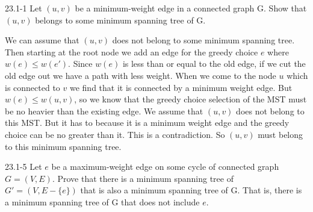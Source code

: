 \begin{problem}{23.1-1}
  Let $(u,v)$ be a minimum-weight edge in a connected graph G. Show that $(u,v)$ belongs to some minimum spanning tree
  of G.
  \begin{solution}
    We can assume that $(u,v)$ does not belong to some minimum spanning tree. Then starting at the root node we add an
    edge for the greedy choice $e$ where $w(e) \le w(e')$.  Since $w(e)$ is less than or equal to the old edge, if we
    cut the old edge out we have a path with less weight.  When we come to the node $u$ which is connected to $v$ we
    find that it is connected by a minimum weight edge. But $w(e) \le w(u,v)$, so we know that the greedy choice
    selection of the MST must be no heavier than the existing edge. We assume that $(u,v)$ does not belong to this
    MST.  But it has to because it is a minimum weight edge and the greedy choice can be no greater than it.  This is a
    contradiction. So $(u,v)$ must belong to this minimum spanning tree.
  \end{solution}
\end{problem}

\begin{problem}{23.1-5}
  Let $e$ be a maximum-weight edge on some cycle of connected graph $G = (V,E)$. Prove that there is a minimum spanning
  tree of $G' = (V,E - \{e\})$ that is also a minimum spanning tree of G. That is, there is a minimum spanning tree of G
  that does not include $e$.
\end{problem}


